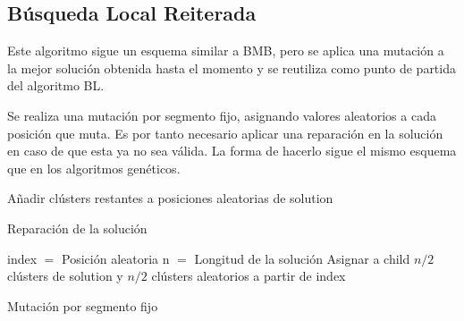 \newpage


\subsection{Búsqueda Local Reiterada}

Este algoritmo sigue un esquema similar a BMB, pero se aplica una mutación a la mejor solución obtenida hasta el momento y se reutiliza como punto de partida del algoritmo BL.


Se realiza una mutación por segmento fijo, asignando valores aleatorios a cada posición que muta. Es por tanto necesario aplicar una reparación en la solución en caso de que esta ya no sea válida. La forma de hacerlo sigue el mismo esquema que en los algoritmos genéticos.

\vspace{\baselineskip}

\begin{algorithm}[H]
    \SetAlgoLined
         {
            Añadir clústers restantes a posiciones aleatorias de solution \;
        }
    \caption{Reparación de la solución}
\end{algorithm}

\vspace{\baselineskip}

\begin{algorithm}[H]
    \SetAlgoLined
        index $=$ Posición aleatoria \;
        n $=$ Longitud de la solución \;
        Asignar a child $n/2$ clústers de solution y $n/2$ clústers aleatorios a partir de index \;
    \caption{Mutación por segmento fijo}
\end{algorithm}

\vspace{\baselineskip}

